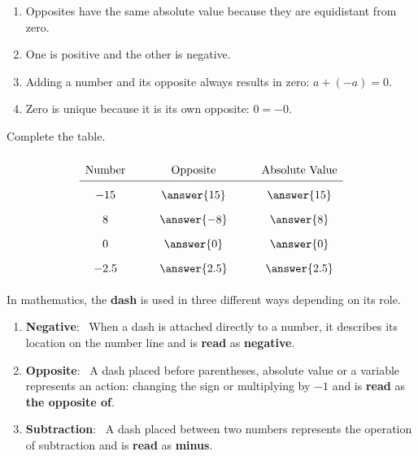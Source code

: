 \documentclass{ximera}[font=12pt]
\begin{document}
\begin{enumerate}
\item Opposites have the same absolute value because they are equidistant from zero.

\item One is positive and the other is negative.

\item Adding a number and its opposite always results in zero: $a +(-a) = 0.$

\item Zero is unique because it is its own opposite: $0= -0.$

\end{enumerate}


\begin{problem}
Complete the table.

\[
\renewcommand{\arraystretch}{1.8}
\begin{array}{c @{\hspace{30pt}} c @{\hspace{30pt}} c}
\text{Number} & \text{Opposite} & \text{Absolute Value} \\
\hline
-15 & \answer{15} & \answer{15} \\
8 & \answer{-8} & \answer{8} \\
0 & \answer{0} & \answer{0} \\
-2.5 & \answer{2.5} & \answer{2.5} \\
\end{array}
\]

\end{problem}

\begin{definition}

In mathematics, the \textbf{dash} is used in three different ways depending on its role.

\begin{enumerate}
    \item \textbf{Negative}: \ When a dash is attached directly to a number, it describes its location on the number line and
    is \textbf{read} as \textbf{negative}. \\

    \item \textbf{Opposite}: \ A dash placed before parentheses, absolute value or a variable represents an action: changing the sign or multiplying by 
    $-1$ and is \textbf{read} as \textbf{the opposite of}. \\

    \item \textbf{Subtraction}: \ A dash placed between two numbers represents the operation of subtraction and is \textbf{read} as \textbf{minus}.
\end{enumerate}

\end{definition}
\end{document}
